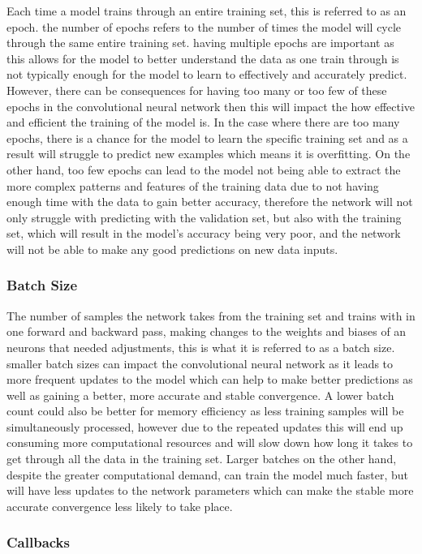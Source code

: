 \documentclass[]{final_report}
\begin{document}
Each time a model trains through an entire training set, this is referred to as an epoch. the number of epochs refers to the number of times the model will cycle through the same entire training set. having multiple epochs are important as this allows for the model to better understand the data as one train through is not typically enough for the model to learn to effectively and accurately predict. However, there can be consequences for having too many or too few of these epochs in the convolutional neural network then this will impact the how effective and efficient the training of the model is. In the case where there are too many epochs, there is a chance for the model to learn the specific training set and as a result will struggle to predict new examples which means it is overfitting. On the other hand, too few epochs can lead to the model not being able to extract the more complex patterns and features of the training data due to not having enough time with the data to gain better accuracy, therefore the network will not only struggle with predicting with the validation set, but also with the training set, which will result in the model’s accuracy being very poor, and the network will not be able to make any good predictions on new data inputs.

\subsubsection{Batch Size}

The number of samples the network takes from the training set and trains with in one forward and backward pass, making changes to the weights and biases of an neurons that needed adjustments, this is what it is referred to as a batch size. smaller batch sizes can impact the convolutional neural network as it leads to more frequent updates to the model which can help to make better predictions as well as gaining a better, more accurate and stable convergence. A lower batch count could also be better for memory efficiency as less training samples will be simultaneously processed, however due to the repeated updates this will end up consuming more computational resources and will slow down how long it takes to get through all the data in the training set. Larger batches on the other hand, despite the greater computational demand, can train the model much faster, but will have less updates to the network parameters which can make the stable more accurate convergence less likely to take place.

\subsubsection{Callbacks}
\end{document}
